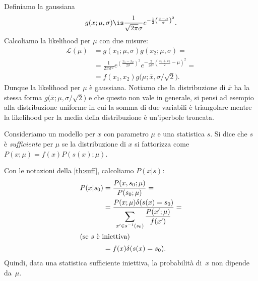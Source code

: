 
Definiamo la gaussiana
\begin{equation*}
	g(x;\mu,\sigma) \is \frac1{\sqrt{2\pi}\sigma} e^{-\frac12 \left( \frac{x-\mu}\sigma \right)^2}.
\end{equation*}
Calcoliamo la likelihood per $\mu$ con due misure:
\begin{align*}
	\mathcal L(\mu)
	&= g(x_1;\mu,\sigma) g(x_2;\mu,\sigma) = \\
	&= \frac1{2\pi\sigma^2}
	e^{\left( \frac{x_1-x_2}{2\sigma} \right)^2}
	e^{-\frac2{2\sigma^2} \left( \frac{x_1+x_2}2 - \mu \right)^2} = \\
	&= f(x_1,x_2) g \big( \mu;\bar x,\sigma/\sqrt2 \big).
\end{align*}
Dunque la likelihood per $\mu$ è gaussiana.
Notiamo che la distribuzione di $\bar x$ ha la stessa forma $g \big( \bar x;\mu,\sigma/\sqrt2 \big)$
e che questo non vale in generale, si pensi ad esempio alla distribuzione uniforme
in cui la somma di due variabili è triangolare mentre la likelihood per la media della distribuzione è un'iperbole troncata.

\begin{definition}[Sufficienza]
	\label{th:suff}
	Consideriamo un modello per $x$ con parametro $\mu$ e una statistica $s$.
	Si dice che $s$ è \emph{sufficiente} per $\mu$ se la distribuzione di $x$ si fattorizza come
	$P(x;\mu) = f(x) P(s(x);\mu)$.
\end{definition}

Con le notazioni della \autoref{th:suff}, calcoliamo $P(x|s)$:
\begin{align*}
	P(x|s_0)
	&= \frac{P(x,s_0;\mu)}{P(s_0;\mu)} = \\
	&= \frac{P(x;\mu) \delta(s(x)=s_0)}{\displaystyle \sum_{x'\in s^{-1}(s_0)} \frac{P(x';\mu)}{f(x')}} = \\
	\intertext{(se $s$ è iniettiva)}
	&= f(x) \delta(s(x)=s_0).
\end{align*}
%
Quindi, data una statistica sufficiente iniettiva, la probabilità di~$x$ non dipende da~$\mu$.
